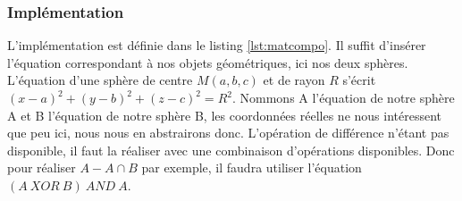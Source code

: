 \documentclass{tnreport}
\begin{document}
\subsubsection{Implémentation}
L'implémentation est définie dans le listing \ref{lst:matcompo}. Il suffit d'insérer l'équation correspondant à nos objets géométriques, ici nos deux sphères. L'équation d'une sphère de centre $M(a,b,c)$ et de rayon $R$ s'écrit $(x-a)^2 + (y-b)^2 + (z-c)^2= R^2$. 
Nommons A l'équation de notre sphère A et B l'équation de notre sphère B, les coordonnées réelles ne nous intéressent que peu ici, nous nous en abstrairons donc. L'opération de différence n'étant pas disponible, il faut la réaliser avec une combinaison d'opérations disponibles. Donc pour réaliser $A-A \cap B$ par exemple, il faudra utiliser l'équation $(A\ XOR\ B)\ AND\ A$. 
\end{document}
